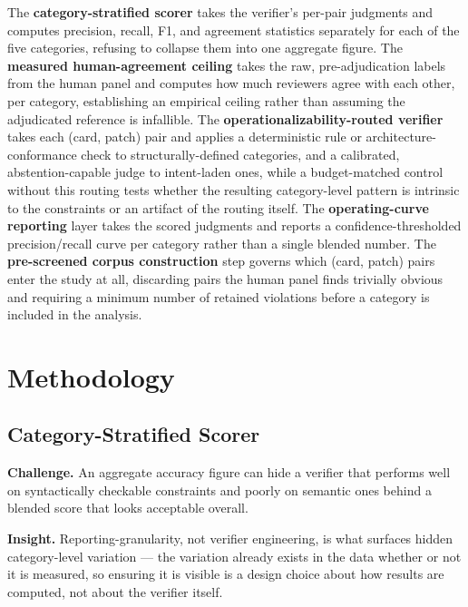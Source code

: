 \documentclass[11pt]{article}
\begin{document}
The \textbf{category-stratified scorer} takes the verifier's per-pair judgments and computes precision, recall, F1, and agreement statistics separately for each of the five categories, refusing to collapse them into one aggregate figure. The \textbf{measured human-agreement ceiling} takes the raw, pre-adjudication labels from the human panel and computes how much reviewers agree with each other, per category, establishing an empirical ceiling rather than assuming the adjudicated reference is infallible. The \textbf{operationalizability-routed verifier} takes each (card, patch) pair and applies a deterministic rule or architecture-conformance check to structurally-defined categories, and a calibrated, abstention-capable judge to intent-laden ones, while a budget-matched control without this routing tests whether the resulting category-level pattern is intrinsic to the constraints or an artifact of the routing itself. The \textbf{operating-curve reporting} layer takes the scored judgments and reports a confidence-thresholded precision/recall curve per category rather than a single blended number. The \textbf{pre-screened corpus construction} step governs which (card, patch) pairs enter the study at all, discarding pairs the human panel finds trivially obvious and requiring a minimum number of retained violations before a category is included in the analysis.

\section{Methodology}

\subsection{Category-Stratified Scorer}
\textbf{Challenge.} An aggregate accuracy figure can hide a verifier that performs well on syntactically checkable constraints and poorly on semantic ones behind a blended score that looks acceptable overall.

\textbf{Insight.} Reporting-granularity, not verifier engineering, is what surfaces hidden category-level variation --- the variation already exists in the data whether or not it is measured, so ensuring it is visible is a design choice about how results are computed, not about the verifier itself.
\end{document}
